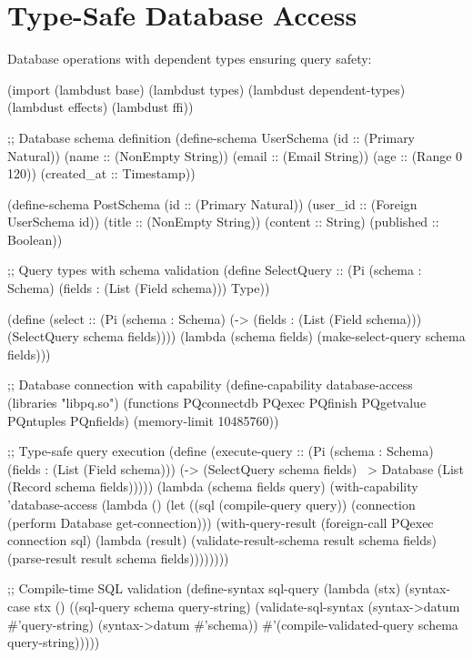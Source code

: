 \section{Type-Safe Database Access}
\label{sec:database-access}

Database operations with dependent types ensuring query safety:

\begin{example}
\begin{lambdustcode}
(import (lambdust base)
        (lambdust types)
        (lambdust dependent-types)
        (lambdust effects)
        (lambdust ffi))

;; Database schema definition
(define-schema UserSchema
  (id :: (Primary Natural))
  (name :: (NonEmpty String))
  (email :: (Email String))
  (age :: (Range 0 120))
  (created_at :: Timestamp))

(define-schema PostSchema  
  (id :: (Primary Natural))
  (user_id :: (Foreign UserSchema id))
  (title :: (NonEmpty String))
  (content :: String)
  (published :: Boolean))

;; Query types with schema validation
(define SelectQuery :: (Pi (schema : Schema) (fields : (List (Field schema)))
                          Type))

(define (select :: (Pi (schema : Schema) 
                      (-> (fields : (List (Field schema)))
                          (SelectQuery schema fields))))
  (lambda (schema fields)
    (make-select-query schema fields)))

;; Database connection with capability
(define-capability database-access
  (libraries "libpq.so")
  (functions PQconnectdb PQexec PQfinish PQgetvalue PQntuples PQnfields)
  (memory-limit 10485760))

;; Type-safe query execution  
(define (execute-query :: (Pi (schema : Schema) (fields : (List (Field schema)))
                             (-> (SelectQuery schema fields) 
                                 ~> {Database} 
                                 (List (Record schema fields)))))
  (lambda (schema fields query)
    (with-capability 'database-access
      (lambda ()
        (let ((sql (compile-query query))
              (connection (perform Database get-connection)))
          (with-query-result (foreign-call PQexec connection sql)
            (lambda (result)
              (validate-result-schema result schema fields)
              (parse-result result schema fields))))))))

;; Compile-time SQL validation
(define-syntax sql-query
  (lambda (stx)
    (syntax-case stx ()
      ((sql-query schema query-string)
       (validate-sql-syntax (syntax->datum #'query-string) 
                           (syntax->datum #'schema))
       #'(compile-validated-query schema query-string)))))


\end{lambdustcode}
\end{example}
